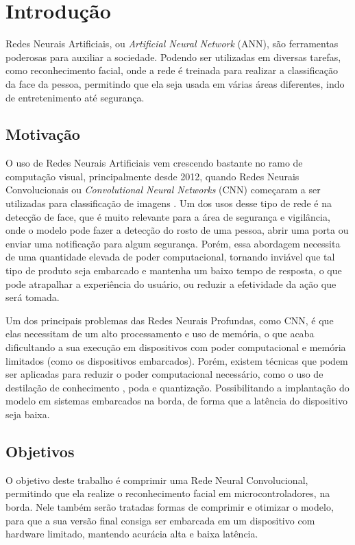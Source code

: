 \chapter{Introdução}

Redes Neurais Artificiais, ou \textit{Artificial Neural Network} (ANN), são ferramentas poderosas para auxiliar a
sociedade.
Podendo ser utilizadas em diversas tarefas, como reconhecimento facial, onde a rede é treinada para realizar a
classificação da face da pessoa, permitindo que ela seja usada em várias áreas diferentes, indo de entretenimento até
segurança.

\section{Motivação}
O uso de Redes Neurais Artificiais vem crescendo bastante no ramo de computação visual, principalmente desde 2012,
quando Redes Neurais Convolucionais ou \textit{Convolutional Neural Networks} (CNN) começaram a ser utilizadas para
classificação de imagens \cite{alexnet}.
Um dos usos desse tipo de rede é na detecção de face, que é muito relevante para a área de segurança e
vigilância, onde o modelo pode fazer a detecção do rosto de uma pessoa, abrir uma porta ou enviar uma notificação
para algum segurança.
Porém, essa abordagem necessita de uma quantidade elevada de poder computacional, tornando inviável que tal tipo de
produto seja embarcado e mantenha um baixo tempo de resposta, o que pode atrapalhar a experiência do usuário, ou
reduzir a efetividade da ação que será tomada.

Um dos principais problemas das Redes Neurais Profundas, como CNN, é que elas necessitam de um alto processamento e uso
de memória, o que acaba dificultando a sua execução em dispositivos com poder computacional e memória limitados (como os dispositivos embarcados).
Porém, existem técnicas que podem ser aplicadas para reduzir o poder computacional necessário, como o uso de
destilação de conhecimento \cite{hinton2015distilling}, poda e quantização.
Possibilitando a implantação do modelo em sistemas embarcados na borda, de forma que a latência do dispositivo seja
baixa.

\section{Objetivos}

O objetivo deste trabalho é comprimir uma Rede Neural Convolucional, permitindo que ela realize o reconhecimento
facial em microcontroladores, na borda.
Nele também serão tratadas formas de comprimir e otimizar o modelo, para que a sua versão final consiga ser embarcada
em um dispositivo com hardware limitado, mantendo acurácia alta e baixa latência.

